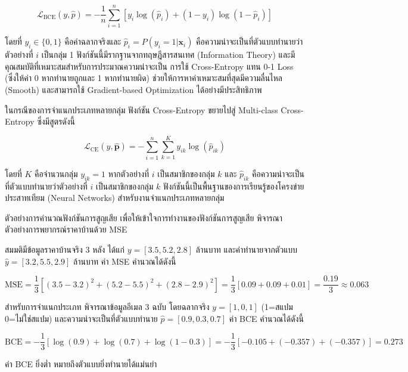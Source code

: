 \[
\mathcal{L}_{\text{BCE}}(y, \hat{p}) = -\frac{1}{n}\sum_{i=1}^{n}\left[y_i \log(\hat{p}_i) + (1 - y_i)\log(1 - \hat{p}_i)\right]
\]

โดยที่ $y_i \in \{0, 1\}$ คือค่าฉลากจริงและ $\hat{p}_i = P(y_i = 1|\mathbf{x}_i)$ คือความน่าจะเป็นที่ตัวแบบทำนายว่าตัวอย่างที่ $i$ เป็นกลุ่ม 1 ฟังก์ชันนี้มีรากฐานจากทฤษฎีสารสนเทศ (Information Theory) และมีคุณสมบัติที่เหมาะสมสำหรับการประมาณความน่าจะเป็น การใช้ Cross-Entropy แทน 0-1 Loss (ซึ่งให้ค่า 0 หากทำนายถูกและ 1 หากทำนายผิด) ช่วยให้การหาค่าเหมาะสมที่สุดมีความลื่นไหล (Smooth) และสามารถใช้ Gradient-based Optimization ได้อย่างมีประสิทธิภาพ

ในกรณีของการจำแนกประเภทหลายกลุ่ม ฟังก์ชัน Cross-Entropy ขยายไปสู่ Multi-class Cross-Entropy ซึ่งมีสูตรดังนี้

\[
\mathcal{L}_{\text{CE}}(y, \hat{\mathbf{p}}) = -\sum_{i=1}^{n}\sum_{k=1}^{K}y_{ik}\log(\hat{p}_{ik})
\]

โดยที่ $K$ คือจำนวนกลุ่ม $y_{ik} = 1$ หากตัวอย่างที่ $i$ เป็นสมาชิกของกลุ่ม $k$ และ $\hat{p}_{ik}$ คือความน่าจะเป็นที่ตัวแบบทำนายว่าตัวอย่างที่ $i$ เป็นสมาชิกของกลุ่ม $k$ ฟังก์ชันนี้เป็นพื้นฐานของการเรียนรู้ของโครงข่ายประสาทเทียม (Neural Networks) สำหรับงานจำแนกประเภทหลายกลุ่ม

\begin{myBox}[]{ตัวอย่างการคำนวณฟังก์ชันการสูญเสีย}{}
เพื่อให้เข้าใจการทำงานของฟังก์ชันการสูญเสีย พิจารณาตัวอย่างการพยากรณ์ราคาบ้านด้วย MSE

สมมติมีข้อมูลราคาบ้านจริง 3 หลัง ได้แก่ $y = [3.5, 5.2, 2.8]$ ล้านบาท และค่าทำนายจากตัวแบบ $\hat{y} = [3.2, 5.5, 2.9]$ ล้านบาท ค่า MSE คำนวณได้ดังนี้

\[
\text{MSE} = \frac{1}{3}\left[(3.5-3.2)^2 + (5.2-5.5)^2 + (2.8-2.9)^2\right] = \frac{1}{3}\left[0.09 + 0.09 + 0.01\right] = \frac{0.19}{3} \approx 0.063
\]

สำหรับการจำแนกประเภท พิจารณาข้อมูลอีเมล 3 ฉบับ โดยฉลากจริง $y = [1, 0, 1]$ (1=สแปม 0=ไม่ใช่สแปม) และความน่าจะเป็นที่ตัวแบบทำนาย $\hat{p} = [0.9, 0.3, 0.7]$ ค่า BCE คำนวณได้ดังนี้

\[
\text{BCE} = -\frac{1}{3}\left[\log(0.9) + \log(0.7) + \log(1-0.3)\right] = -\frac{1}{3}\left[-0.105 + (-0.357) + (-0.357)\right] = 0.273
\]

ค่า BCE ยิ่งต่ำ หมายถึงตัวแบบยิ่งทำนายได้แม่นยำ
\end{myBox}

